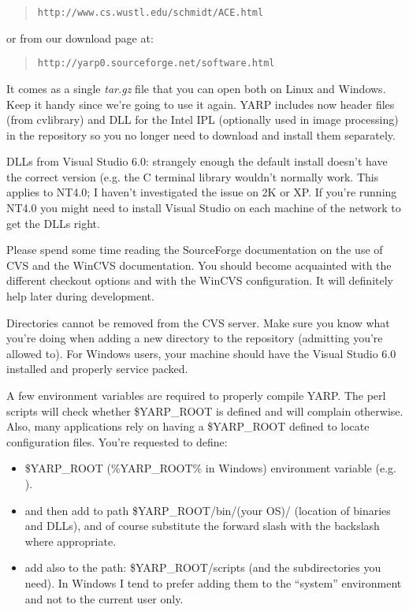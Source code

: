 \begin{quote}
{\tt http://www.cs.wustl.edu/schmidt/ACE.html}
\end{quote}

or from our download page at:
\begin{quote}
{\tt http://yarp0.sourceforge.net/software.html}
\end{quote}

It comes as a single {\em tar.gz} file that you can open both on Linux and Windows. Keep it handy since we're going to use it again. YARP includes now header files (from cvlibrary) and DLL for the Intel IPL (optionally used in image processing) in the repository so you no longer need to download and install them separately.

DLLs from Visual Studio 6.0: strangely enough the default install doesn't have the
correct version (e.g. the C terminal library wouldn't normally work. This applies to
NT4.0; I haven't investigated the issue on 2K or XP. If you're running NT4.0 you might
need to install Visual Studio on each machine of the network to get the DLLs right.

Please spend some time reading the SourceForge documentation on the use of CVS and
the WinCVS documentation. You should become acquainted with the different checkout
options and with the WinCVS configuration. It will definitely help later during
development.

Directories cannot be removed from the CVS server. Make sure you know what
you're doing when adding a new directory to the repository (admitting you're allowed to).
For Windows users, your machine should have the Visual Studio 6.0 installed and properly
service packed.

A few environment variables are required to properly compile YARP. The perl scripts will check whether \$YARP\_ROOT is defined and will complain otherwise. Also, many applications rely on having a \$YARP\_ROOT defined to locate configuration files. You're requested to define:
\begin{itemize}
\item \$YARP\_ROOT (\%YARP\_ROOT\% in Windows) environment variable (e.g. ).
\item and then add to path \$YARP\_ROOT/bin/(your OS)/ (location of binaries and DLLs), and of course substitute the forward slash with the backslash where appropriate.
\item add also to the path: \$YARP\_ROOT/scripts (and the subdirectories you need). In Windows I tend to prefer adding them to the ``system'' environment and not to the current user only.
\end{itemize}

